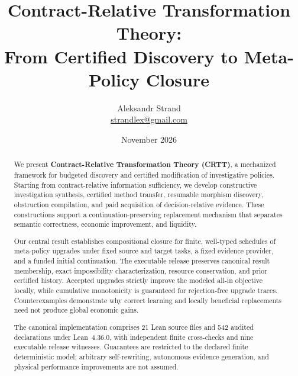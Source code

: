 \documentclass[10pt,letterpaper]{article}
\begin{document}

\title{\textbf{Contract-Relative Transformation Theory:}\\
\large From Certified Discovery to Meta-Policy Closure}

\author{Aleksandr Strand\\[-1pt]{\small\href{mailto:strandlex@gmail.com}{strandlex@gmail.com}}}
\date{\vspace{-11pt}November 2026}

\maketitle

\begin{abstract}
We present \textbf{Contract-Relative Transformation Theory (CRTT)}, a mechanized framework for budgeted discovery and certified modification of investigative policies. Starting from contract-relative information sufficiency, we develop constructive investigation synthesis, certified method transfer, resumable morphism discovery, obstruction compilation, and paid acquisition of decision-relative evidence. These constructions support a continuation-preserving replacement mechanism that separates semantic correctness, economic improvement, and liquidity.

Our central result establishes compositional closure for finite, well-typed schedules of meta-policy upgrades under fixed source and target tasks, a fixed evidence provider, and a funded initial continuation. The executable release preserves canonical result membership, exact impossibility characterization, resource conservation, and prior certified history. Accepted upgrades strictly improve the modeled all-in objective locally, while cumulative monotonicity is guaranteed for rejection-free upgrade traces. Counterexamples demonstrate why correct learning and locally beneficial replacements need not produce global economic gains.

The canonical implementation comprises 21 Lean source files and 542 audited declarations under Lean~4.36.0, with independent finite cross-checks and nine executable release witnesses. Guarantees are restricted to the declared finite deterministic model; arbitrary self-rewriting, autonomous evidence generation, and physical performance improvements are not assumed.
\end{abstract}
\end{document}

